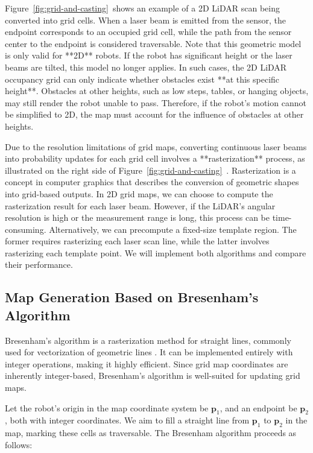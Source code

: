 Figure~\ref{fig:grid-and-casting}~shows an example of a 2D LiDAR scan being converted into grid cells. When a laser beam is emitted from the sensor, the endpoint corresponds to an occupied grid cell, while the path from the sensor center to the endpoint is considered traversable. Note that this geometric model is only valid for **2D** robots. If the robot has significant height or the laser beams are tilted, this model no longer applies. In such cases, the 2D LiDAR occupancy grid can only indicate whether obstacles exist **at this specific height**. Obstacles at other heights, such as low steps, tables, or hanging objects, may still render the robot unable to pass. Therefore, if the robot's motion cannot be simplified to 2D, the map must account for the influence of obstacles at other heights.  

Due to the resolution limitations of grid maps, converting continuous laser beams into probability updates for each grid cell involves a **rasterization** process, as illustrated on the right side of Figure~\ref{fig:grid-and-casting}~. Rasterization is a concept in computer graphics that describes the conversion of geometric shapes into grid-based outputs. In 2D grid maps, we can choose to compute the rasterization result for each laser beam. However, if the LiDAR's angular resolution is high or the measurement range is long, this process can be time-consuming. Alternatively, we can precompute a fixed-size template region. The former requires rasterizing each laser scan line, while the latter involves rasterizing each template point. We will implement both algorithms and compare their performance.

\subsection{Map Generation Based on Bresenham's Algorithm}  
Bresenham's algorithm is a rasterization method for straight lines, commonly used for vectorization of geometric lines \cite{Cohen-Or1997}. It can be implemented entirely with integer operations, making it highly efficient. Since grid map coordinates are inherently integer-based, Bresenham's algorithm is well-suited for updating grid maps.  

Let the robot's origin in the map coordinate system be $\mathbf{p}_1$, and an endpoint be $\mathbf{p}_2$, both with integer coordinates. We aim to fill a straight line from $\mathbf{p}_1$ to $\mathbf{p}_2$ in the map, marking these cells as traversable. The Bresenham algorithm proceeds as follows:  

